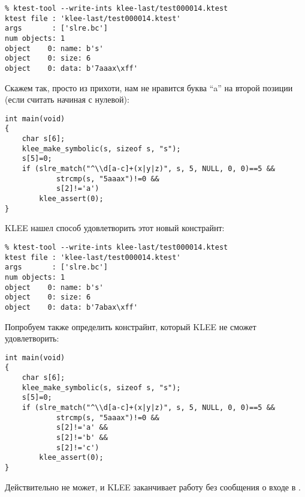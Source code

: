 \begin{lstlisting}
% ktest-tool --write-ints klee-last/test000014.ktest
ktest file : 'klee-last/test000014.ktest'
args       : ['slre.bc']
num objects: 1
object    0: name: b's'
object    0: size: 6
object    0: data: b'7aaax\xff'
\end{lstlisting}

Скажем так, просто из прихоти, нам не нравится буква ``a'' на второй позиции (если считать начиная с нулевой):

\begin{lstlisting}
int main(void)
{
	char s[6];
	klee_make_symbolic(s, sizeof s, "s");
	s[5]=0;
	if (slre_match("^\\d[a-c]+(x|y|z)", s, 5, NULL, 0, 0)==5 &&
			strcmp(s, "5aaax")!=0 &&
			s[2]!='a')
		klee_assert(0);
}
\end{lstlisting}

KLEE нашел способ удовлетворить этот новый констрайнт:

\begin{lstlisting}
% ktest-tool --write-ints klee-last/test000014.ktest
ktest file : 'klee-last/test000014.ktest'
args       : ['slre.bc']
num objects: 1
object    0: name: b's'
object    0: size: 6
object    0: data: b'7abax\xff'
\end{lstlisting}

Попробуем также определить констрайнт, который KLEE не сможет удовлетворить:

\begin{lstlisting}
int main(void)
{
	char s[6];
	klee_make_symbolic(s, sizeof s, "s");
	s[5]=0;
	if (slre_match("^\\d[a-c]+(x|y|z)", s, 5, NULL, 0, 0)==5 &&
			strcmp(s, "5aaax")!=0 &&
			s[2]!='a' &&
			s[2]!='b' &&
			s[2]!='c')
		klee_assert(0);
}
\end{lstlisting}

Действительно не может, и KLEE заканчивает работу без сообщения о входе в .

